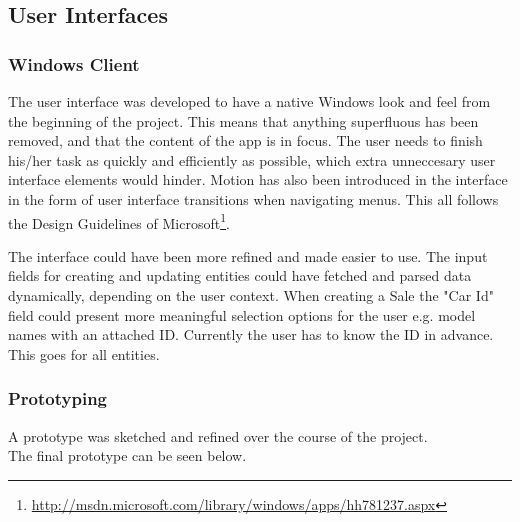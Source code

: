 \subsection{User Interfaces}

\subsubsection{Windows Client}
The user interface was developed to have a native Windows look and feel from the beginning of the project. 
This means that anything superfluous has been removed, and that the content of the app is in focus. 
The user needs to finish his/her task as quickly and efficiently as possible, which extra unneccesary user interface elements would hinder.
Motion has also been introduced in the interface in the form of user interface transitions when navigating menus. 
This all follows the Design Guidelines of Microsoft\footnote{\url{http://msdn.microsoft.com/library/windows/apps/hh781237.aspx}}.

The interface could have been more refined and made easier to use. The input fields for creating and updating entities could have fetched and parsed data dynamically, depending on the user context. 
When creating a Sale the "Car Id" field could present more meaningful selection options for the user e.g. model names with an attached ID. Currently the user has to know the ID in advance. This goes for all entities.

\subsubsection{Prototyping}
A prototype was sketched and refined over the course of the project.\\
The final prototype can be seen below.\\

